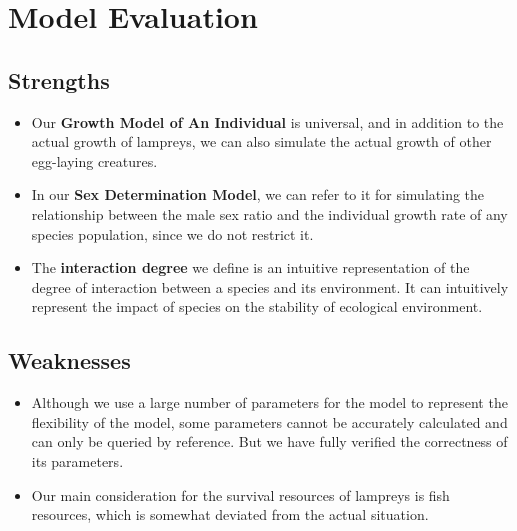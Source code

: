 \documentclass[12pt]{article}  %
\begin{document}
\section{Model Evaluation}
\subsection{Strengths}
\begin{itemize}
	\setlength{\parsep}{0ex} %
	\setlength{\topsep}{2ex} %
	\setlength{\itemsep}{1ex} %
	\item Our  \textbf{Growth Model  of An Individual}  is universal, and in addition to the actual growth of lampreys, we can also simulate the actual growth of other egg-laying creatures.
	\item In our \textbf{Sex Determination Model}, we can refer to it for simulating the relationship between the male sex ratio and the individual growth rate of any species population, since we do not restrict it.
	\item The \textbf{interaction degree}   we define is an intuitive representation of the degree of interaction between a species and its environment. It can intuitively represent the impact of species on the stability of ecological environment.
\end{itemize}
\subsection{Weaknesses }
\begin{itemize}
	\setlength{\parsep}{0ex} %
	\setlength{\topsep}{2ex} %
	\setlength{\itemsep}{1ex} %
	\item Although we use a large number of parameters for the model to represent the flexibility of the model, some parameters cannot be accurately calculated and can only be queried by reference. But we have fully verified the correctness of its parameters.
	\item Our main consideration for the survival resources of lampreys is fish resources, which is somewhat deviated from the actual situation.
\end{itemize}
\end{document}
